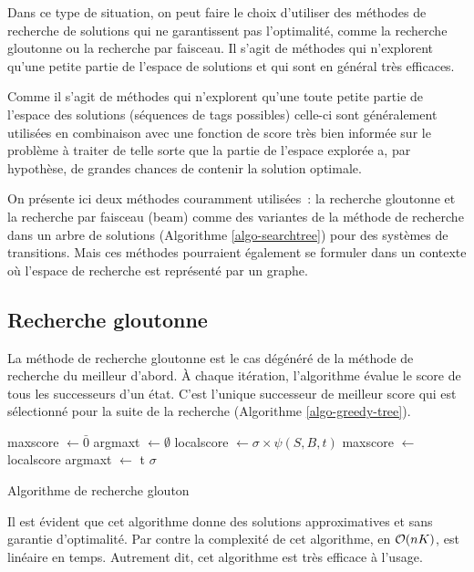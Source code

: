 \documentclass[11pt,openany]{book}
\begin{document}
Dans ce type de situation, on peut faire le choix d'utiliser des
méthodes de recherche de solutions qui ne garantissent pas
l'optimalité, comme la recherche gloutonne ou la recherche par
faisceau. Il s'agit de méthodes qui n'explorent qu'une petite partie
de l'espace de solutions et qui sont en général très efficaces.

Comme il s'agit de méthodes qui n'explorent qu'une toute petite
partie de l'espace des solutions (séquences de tags possibles)
celle-ci sont généralement utilisées en combinaison avec une fonction
de score très bien informée sur le problème à traiter de telle sorte que la
partie de l'espace explorée a, par hypothèse, de grandes chances de contenir la
solution optimale. 

On présente ici deux méthodes couramment utilisées~:  la recherche
gloutonne et la recherche par faisceau (beam) comme des variantes de
la méthode de recherche dans un arbre de solutions (Algorithme
\ref{algo-searchtree}) pour des systèmes de transitions. 
Mais ces méthodes pourraient également se formuler dans un contexte où l'espace de
recherche est représenté par un graphe.

\subsection{Recherche gloutonne}

La méthode de recherche gloutonne est le cas dégénéré de la méthode de
recherche du meilleur d'abord. \`A chaque itération, l'algorithme évalue
le score de tous les successeurs d'un état. C'est l'unique successeur
de meilleur score qui est sélectionné pour la suite de la recherche
(Algorithme \ref{algo-greedy-tree}).
\begin{algorithm}[htbp]
\begin{algorithmic}[1]
\State maxscore $\gets \bar{0}$
\State argmaxt $\gets \emptyset$ 
	\State localscore $\gets \sigma \times \psi(S,B,t)$
              \State maxscore $\gets$ localscore
              \State argmaxt $\gets$ t
        \EndIf
\EndFor
\State\Return {}
\Else
  \State\Return $\sigma$
\EndIf
\EndFunction
\end{algorithmic}
\caption{\label{algo-greedy-tree}Algorithme de recherche glouton}
\end{algorithm}
Il est évident que cet algorithme donne des solutions approximatives
et sans garantie d'optimalité. Par contre la complexité de cet
algorithme, en ${\cal O}(n K)$,  est linéaire en temps. Autrement dit,
cet algorithme est très efficace à l'usage.
\end{document}
